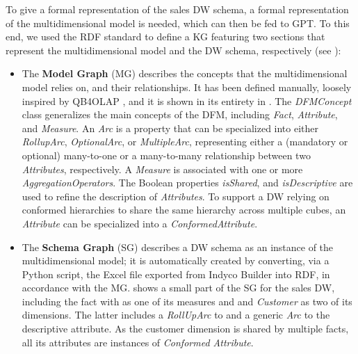 To give a formal representation of the sales DW schema, a formal representation of the multidimensional model is needed, which can then be fed to GPT. To this end, we used the RDF standard to define a KG featuring two sections that represent the multidimensional model and the DW schema, respectively (see ):
\begin{itemize}
    \item The \textbf{Model Graph} (MG) describes the concepts that the multidimensional model relies on, and their relationships. It has been defined manually, loosely inspired by QB4OLAP \cite{DBLP:conf/dawak/EtcheverryVZ14}, and it is shown in its entirety in . The \textit{DFMConcept} class generalizes the main concepts of the DFM, including \textit{Fact}, \textit{Attribute}, and \textit{Measure}. An \textit{Arc} is a property that can be specialized into either \textit{RollupArc}, \textit{OptionalArc}, or \textit{MultipleArc}, representing either a (mandatory or optional) many-to-one or a many-to-many relationship between two \textit{Attributes}, respectively. A \textit{Measure} is associated with one or more \textit{AggregationOperators}. The Boolean properties \textit{isShared}, and \textit{isDescriptive} are used to refine the description of \textit{Attributes}.
    To support a DW relying on conformed hierarchies to share the same hierarchy across multiple cubes, an \textit{Attribute} can be specialized into a \textit{ConformedAttribute}.
    \item The \textbf{Schema Graph} (SG) describes a DW schema as an instance of the multidimensional model; it is automatically created by converting, via a Python script, the Excel file exported from Indyco Builder into RDF, in accordance with the MG.  shows a small part of the SG for the sales DW, including the  fact with  as one of its measures and  and \textit{Customer} as two of its dimensions. The latter includes a \textit{RollUpArc} to  and a generic \textit{Arc} to the  descriptive attribute. As the customer dimension is shared by multiple facts, all its attributes are instances of \textit{Conformed Attribute}.
\end{itemize}


